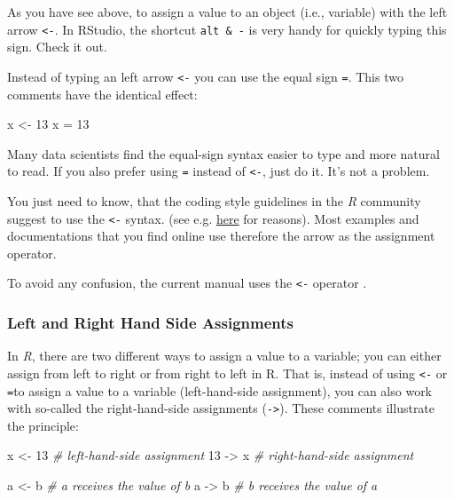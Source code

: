 \documentclass[
]{scrartcl}
\newenvironment{Shaded}{\begin{snugshade}}{\end{snugshade}}
\newcommand{\CommentTok}[1]{\textcolor[rgb]{0.56,0.35,0.01}{\textit{#1}}}
\newcommand{\DecValTok}[1]{\textcolor[rgb]{0.00,0.00,0.81}{#1}}
\newcommand{\NormalTok}[1]{#1}
\newcommand{\OtherTok}[1]{\textcolor[rgb]{0.56,0.35,0.01}{#1}}
\begin{document}
As you have see above, to assign a value to an object (i.e., variable)
with the left arrow \texttt{\textless{}-}. In RStudio, the shortcut \texttt{alt\ \&\ -} is very
handy for quickly typing this sign. Check it out.

Instead of typing an left arrow \texttt{\textless{}-} you can use the equal sign \texttt{=}.
This two comments have the identical effect:

\begin{Shaded}
\begin{Highlighting}[]
\NormalTok{x }\OtherTok{\textless{}{-}} \DecValTok{13}
\NormalTok{x }\OtherTok{=} \DecValTok{13}
\end{Highlighting}
\end{Shaded}

Many data scientists find the equal-sign syntax easier to type and more
natural to read. If you also prefer using \texttt{=} instead of \texttt{\textless{}-}, just do
it. It's not a problem.

You just need to know, that the coding style guidelines in the \emph{R}
community suggest to use the \texttt{\textless{}-} syntax. (see e.g.
\href{https://www.r-bloggers.com/why-do-we-use-arrow-as-an-assignment-operator/}{here}
for reasons). Most examples and documentations that you find online use
therefore the arrow as the assignment operator.

To avoid any confusion, the current manual uses the \texttt{\textless{}-} operator .

\subsubsection{Left and Right Hand Side Assignments}\label{left-and-right-hand-side-assignments}

In \emph{R}, there are two different ways to assign a value to a variable;
you can either assign from left to right or from right to left in R.
That is, instead of using \texttt{\textless{}-} or \texttt{=}to assign a value to a variable
(left-hand-side assignment), you can also work with so-called the
right-hand-side assignments (\texttt{-\textgreater{}}). These comments illustrate the
principle:

\begin{Shaded}
\begin{Highlighting}[]
\NormalTok{x }\OtherTok{\textless{}{-}} \DecValTok{13}       \CommentTok{\# left{-}hand{-}side assignment}
\DecValTok{13} \OtherTok{{-}\textgreater{}}\NormalTok{ x       }\CommentTok{\# right{-}hand{-}side assignment}

\NormalTok{a }\OtherTok{\textless{}{-}}\NormalTok{ b        }\CommentTok{\# a receives the value of b}
\NormalTok{a }\OtherTok{{-}\textgreater{}}\NormalTok{ b        }\CommentTok{\# b receives the value of a}
\end{Highlighting}
\end{Shaded}
\end{document}
